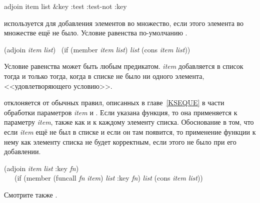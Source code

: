 \begin{defun}[Функция]
adjoin item list &key :test :test-not :key

 используется для добавления элементов во множество, если этого
элемента во множестве ещё не было. Условие равенства по-умолчанию .
\begin{lisp}
(adjoin \emph{item} \emph{list}) \EQ\ (if (member \emph{item} \emph{list}) \emph{list} (cons \emph{item} \emph{list}))
\end{lisp}
Условие равенства может быть любым предикатом. \emph{item} добавляется в список
тогда и только тогда, когда в списке не было ни одного элемента,
<<удовлетворяющего условию>>.

 отклоняется от обычных правил, описанных в главе~\ref{KSEQUE} в
части обработки параметров \emph{item} и .
Если указана  функция, то она применяется к параметру \emph{item}, также
как и к каждому элементу списка. Обоснование в том, что если \emph{item} ещё не
был в списке и если он там появится, то применение функции  к нему как
элементу списка не будет корректным, если этого не было при его добавлении.
\begin{lisp}
(adjoin \emph{item} \emph{list} :key \emph{fn}) \\
~~\EQ\ (if (member (funcall \emph{fn} \emph{item}) \emph{list}
  :key \emph{fn}) \emph{list} (cons \emph{item} \emph{list})) 
\end{lisp}

Смотрите также .
\end{defun}

